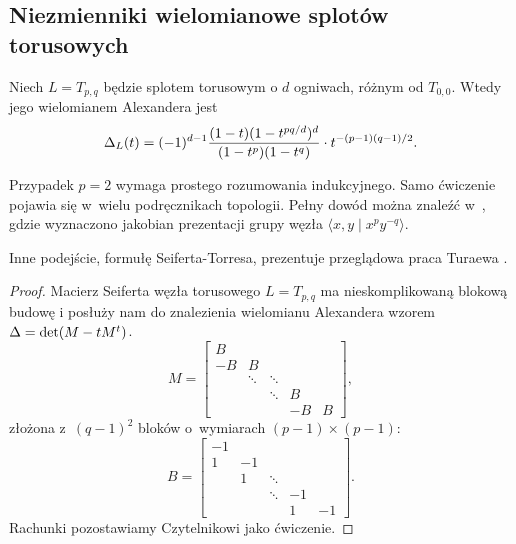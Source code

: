 
\subsection{Niezmienniki wielomianowe splotów torusowych}
\begin{proposition}
    Niech $L = T_{p, q}$ będzie splotem torusowym o $d$ ogniwach, różnym od $T_{0, 0}$.
%
    Wtedy jego wielomianem Alexandera jest
    \begin{equation}
        \Delta_L(t) = (-1)^{d-1} \frac{(1-t)(1 - t^{pq/d})^d}{(1-t^p)(1-t^q)} \cdot t^{-(p-1)(q-1)/2}.
    \end{equation}
\end{proposition}

Przypadek $p = 2$ wymaga prostego rozumowania indukcyjnego.
Samo ćwiczenie pojawia się w~wielu podręcznikach topologii.
Pełny dowód można znaleźć w~\cite[przykład 9.15]{burde14}, gdzie wyznaczono jakobian prezentacji grupy węzła $\langle x, y \mid x^py^{-q}\rangle$.

Inne podejście, formułę Seiferta-Torresa, prezentuje przeglądowa praca Turaewa \cite{turaev86}.

\begin{proof}
    Macierz Seiferta węzła torusowego $L = T_{p, q}$ ma nieskomplikowaną blokową budowę i posłuży nam do znalezienia wielomianu Alexandera wzorem $\Delta = \det (M - tM^t)$.
    \begin{equation}
        M = \begin{bmatrix}
            B & & & & \\
            -B & B & & & \\
            & \ddots & \ddots & & \\
            & & \ddots & B & \\
            & & & -B & B
        \end{bmatrix},
    \end{equation}
    złożona z~$(q-1)^2$ bloków o~wymiarach $(p-1) \times (p-1)$:
    \begin{equation}
        B = \begin{bmatrix}
            -1 & & & & \\
            1 & -1 & & & \\
            & 1 & \ddots & & \\
            & & \ddots & -1 & \\
            & & & 1 & -1
        \end{bmatrix}.
    \end{equation}
    Rachunki pozostawiamy Czytelnikowi jako ćwiczenie.
\end{proof}

